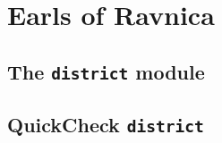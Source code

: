 \newpage
\section*{Earls of Ravnica}

\subsection*{The \texttt{district} module}

\subsection*{QuickCheck \texttt{district}}
